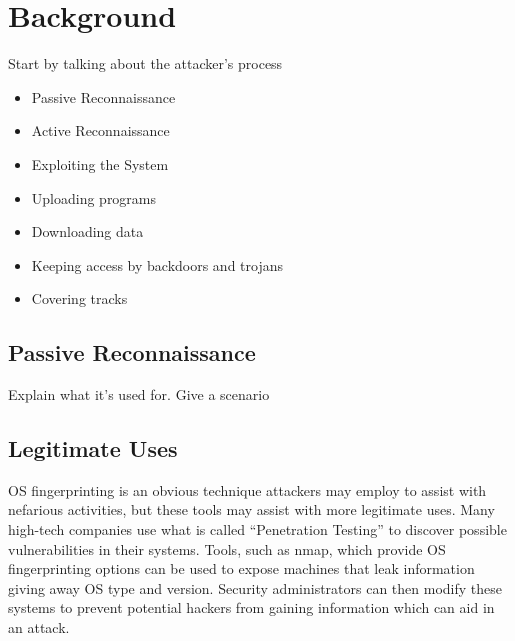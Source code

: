 \section{Background}
Start by talking about the attacker's process
\begin{itemize}
	\item Passive Reconnaissance
	\item Active Reconnaissance
	\item Exploiting the System
	\item Uploading programs
	\item Downloading data
	\item Keeping access by backdoors and trojans
	\item Covering tracks
\end{itemize}

\subsection{Passive Reconnaissance}
Explain what it's used for.
Give a scenario

\subsection{Legitimate Uses}
OS fingerprinting is an obvious technique attackers may employ to assist with nefarious activities, but these tools may assist with more legitimate uses.  Many high-tech companies use what is called ``Penetration Testing'' to discover possible vulnerabilities in their systems.  Tools, such as nmap, which provide OS fingerprinting options can be used to expose machines that leak information giving away OS type and version.  Security administrators can then modify these systems to prevent potential hackers from gaining information which can aid in an attack.